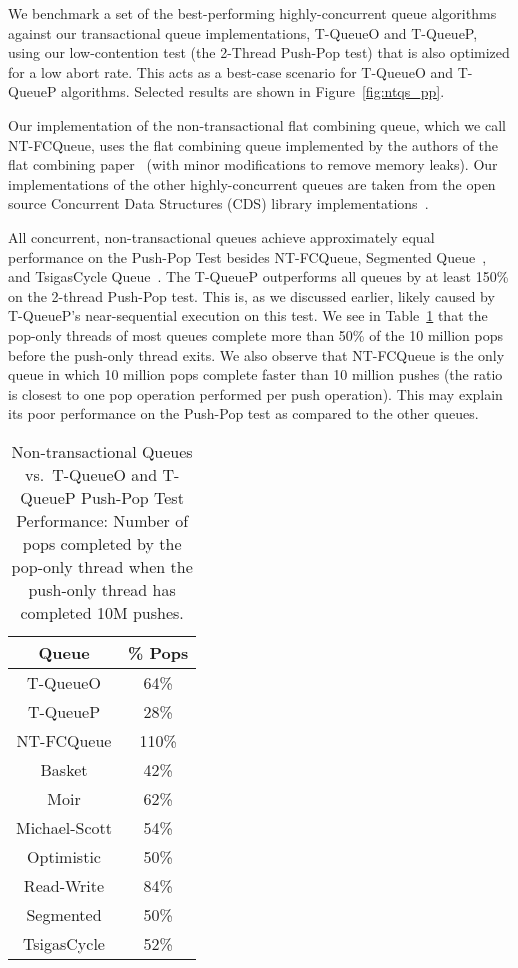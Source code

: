 We benchmark a set of the best-performing highly-concurrent queue algorithms against our transactional queue implementations, T-QueueO and T-QueueP, using our low-contention test (the 2-Thread Push-Pop test) that is also optimized for a low abort rate. This acts as a best-case scenario for T-QueueO and T-QueueP algorithms. Selected results are shown in Figure~\ref{fig:ntqs_pp}.

Our implementation of the non-transactional flat combining queue, which we call NT-FCQueue, uses the flat combining queue implemented by the authors of the flat combining paper~\cite{flatcombining} (with minor modifications to remove memory leaks). Our implementations of the other highly-concurrent queues are taken from the open source Concurrent Data Structures (CDS) library implementations~\cite{libcds}. 

All concurrent, non-transactional queues achieve approximately equal performance on the Push-Pop Test besides NT-FCQueue, Segmented Queue~\cite{queue4}, and TsigasCycle Queue~\cite{queue5}. 
The T-QueueP outperforms all queues by at least 150\% on the 2-thread Push-Pop test. This is, as we discussed earlier, likely caused by T-QueueP's near-sequential execution on this test. We see in Table~\ref{tab:push_pop_ratio} that the pop-only threads of most queues complete more than 50\% of the 10 million pops before the push-only thread exits.
We also observe that NT-FCQueue is the only queue in which 10 million pops complete faster than 10 million pushes (the ratio is closest to one pop operation performed per push operation). This may explain its poor performance on the Push-Pop test as compared to the other queues.

\begin{table}[t]
        \centering
    \begin{tabular}{|cc|}
        \hline
        Queue & \% Pops\\
        \hline
            T-QueueO & 64\%\\
            T-QueueP & 28\%\\
            NT-FCQueue & 110\%\\
            Basket & 42\%\\
            Moir & 62\%\\
            Michael-Scott& 54\%\\
            Optimistic & 50\%\\
            Read-Write & 84\%\\
            Segmented & 50\%\\
            TsigasCycle & 52\%\\
        \hline
    \end{tabular}
    \caption{Non-transactional Queues vs.\ T-QueueO and T-QueueP Push-Pop Test Performance: Number of pops completed by the pop-only thread when the push-only thread has completed 10M pushes.}
    \label{tab:push_pop_ratio}
\end{table}

